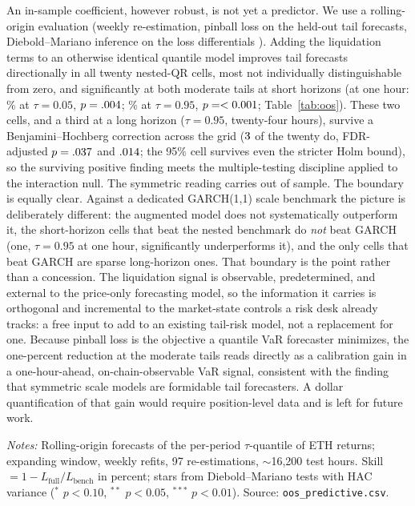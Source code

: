 An in-sample coefficient, however robust, is not yet a predictor. We use a
rolling-origin evaluation (weekly re-estimation, pinball loss on the
held-out tail forecasts, Diebold--Mariano inference on the loss
differentials \citep{diebold1995}). Adding the liquidation terms to an
otherwise identical quantile model improves tail forecasts directionally in
all twenty nested-QR cells, most not individually distinguishable from zero,
and significantly at both moderate tails at short horizons
(at one hour: \OosSkillFiveHone\% at $\tau = 0.05$,
$p = .004$; \OosSkillNinetyFiveHone\% at $\tau = 0.95$,
$p = <0.001$; Table~\ref{tab:oos}). These two cells, and a third at a long horizon ($\tau = 0.95$, twenty-four
hours), survive a Benjamini--Hochberg correction across the grid
($3$ of the twenty do, FDR-adjusted $p = .037$ and $.014$;
the 95\% cell survives even the stricter Holm bound), so the surviving
positive finding meets the multiple-testing discipline applied to the
interaction null. The symmetric reading carries out of sample. The boundary
is equally clear. Against a dedicated GARCH(1,1) scale benchmark the picture is deliberately
different: the augmented model does not systematically outperform it, the
short-horizon cells that beat the nested benchmark do \emph{not} beat GARCH
(one, $\tau = 0.95$ at one hour, significantly underperforms it), and the only
cells that beat GARCH are sparse long-horizon ones. That boundary is the point
rather than a concession. The liquidation signal is observable, predetermined, and
external to the price-only forecasting model, so the information it carries is orthogonal and
incremental to the market-state controls a risk desk already tracks: a free
input to add to an existing tail-risk model, not a replacement for one.
Because pinball loss is the objective a quantile VaR forecaster minimizes,
the one-percent reduction at the moderate tails reads directly as a
calibration gain in a one-hour-ahead, on-chain-observable VaR signal,
consistent with the \citet{brownlees2021} finding that symmetric scale
models are formidable tail forecasters. A dollar quantification of that gain
would require position-level data and is left for future work.

\begin{table}[t]
\centering
\caption{Out-of-sample pinball skill of liquidation information (\%),
against a nested quantile benchmark (top panel) and a dedicated GARCH(1,1)
scale model (bottom panel).}
\label{tab:oos}

\begin{minipage}{0.92\textwidth}
\vspace{2pt}
{\scriptsize \emph{Notes:} Rolling-origin forecasts of the per-period
$\tau$-quantile of ETH returns; expanding window, weekly refits, 97
re-estimations, $\sim$16{,}200 test hours. Skill $= 1 -
L_{\text{full}}/L_{\text{bench}}$ in percent; stars from Diebold--Mariano
tests with HAC variance ($^{*}$ $p<0.10$, $^{**}$ $p<0.05$, $^{***}$
$p<0.01$). Source: \texttt{oos\_predictive.csv}.}
\end{minipage}
\end{table}
